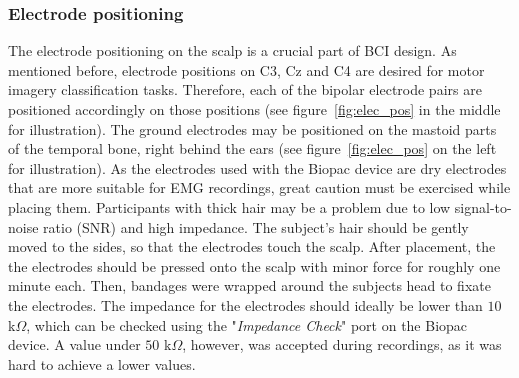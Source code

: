 \documentclass[a4paper,twoside, openright,12pt]{report}
\begin{document}
\subsubsection*{Electrode positioning}
The electrode positioning on the scalp is a crucial part of BCI design. As mentioned before, electrode positions on C3, Cz and C4 are desired for motor imagery classification tasks. Therefore, each of the bipolar electrode pairs are positioned accordingly on those positions (see figure~\ref{fig:elec_pos} in the middle for illustration). The ground electrodes may be positioned on the mastoid parts of the temporal bone, right behind the ears (see figure~\ref{fig:elec_pos} on the left for illustration). As the electrodes used with the Biopac device are dry electrodes that are more suitable for EMG recordings, great caution must be exercised while placing them. Participants with thick hair may be a problem due to low signal-to-noise ratio (SNR) and high impedance. The subject's hair should be gently moved to the sides, so that the electrodes touch the scalp. After placement, the the electrodes should be pressed onto the scalp with minor force for roughly one minute each. Then, bandages were wrapped around the subjects head to fixate the electrodes. The impedance for the electrodes should ideally be lower than $10$ k$\Omega$, which can be checked using the "\textit{Impedance Check}" port on the Biopac device. A value under $50$ k$\Omega$, however, was accepted during recordings, as it was hard to achieve a lower values.\\ 
\end{document}
